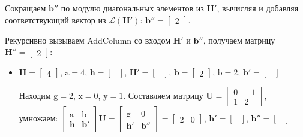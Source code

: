 \begin{enumerate}
Сокращаем $ \mathbf{b}'' $ по модулю диагональных элементов из $ \mathbf{H}' $, вычисляя и добавляя соответствующий вектор из $ \mathcal{L}(\mathbf{H}') $: $ \mathbf{b}'' = \left[ \begin{array}{cccc}
2
\end{array}\right] $.

Рекурсивно вызываем AddColumn со входом $ \mathbf{H}' $ и $ \mathbf{b}'' $, получаем матрицу $ \mathbf{H}'' = \left[\begin{array}{cccc}
2
\end{array}\right] $:
\begin{itemize}
\item $ \mathbf{H} = \left[\begin{array}{cccc}
4
\end{array}\right] $, $ \mathrm{a} = 4 $, $ \mathbf{h} = \left[\begin{array}{cccc}
\end{array}\right] $, $ \mathbf{H}' = \left[ \begin{array}{cccc}
\end{array}\right] $, $ \mathbf{b} = \left[\begin{array}{cccc}
2
\end{array}\right] $, $ \mathrm{b} = 2 $, $ \mathbf{b}' = \left[ \begin{array}{cccc}
\end{array}\right] $

Находим $ \mathrm{g} = 2 $, $ \mathrm{x} = 0 $, $ \mathrm{y} = 1 $. Составляем матрицу $  \mathbf{U} = \left[\begin{array}{cccc}
0 & -1 \\
1 & 2
\end{array}\right] $, умножаем: $ \left[ \begin{array}{cccc}
\mathrm{a} & \mathrm{b} \\
\mathbf{h} & \mathbf{b}' \end{array} \right] \mathbf{U}=
\left[ \begin{array}{cccc}
\mathrm{g} & \mathrm{0} \\
\mathbf{h}' & \mathbf{b}'' \end{array} \right] = \left[\begin{array}{cccc}
2 & 0
\end{array}\right] $, $ \mathbf{h}' = \left[\begin{array}{cccc}
\end{array}\right] $, $ \mathbf{b}'' = \left[\begin{array}{cccc}
\end{array}\right] $


\end{itemize}
\end{enumerate}
